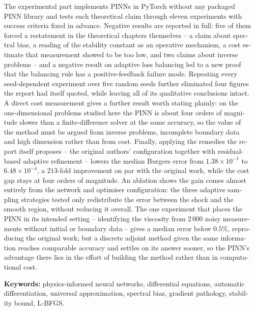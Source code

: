 \begin{english}
The experimental part implements PINNs in PyTorch without any packaged PINN
library and tests each theoretical claim through eleven experiments with success
criteria fixed in advance. Negative results are reported in full: five of them
forced a restatement in the theoretical chapters themselves -- a claim about
spectral bias, a reading of the stability constant as an operative mechanism,
a cost estimate that measurement showed to be too low, and two claims about
inverse problems -- and a negative
result on adaptive loss balancing led to a new proof that the balancing rule has
a positive-feedback failure mode. Repeating every seed-dependent experiment over
five random seeds further eliminated four figures the report had itself quoted,
while leaving all of its qualitative conclusions intact. A
direct cost measurement gives a further result worth stating plainly: on the
one-dimensional problems studied here the PINN is about four orders of magnitude
slower than a finite-difference solver at the same accuracy, so the value of the
method must be argued from inverse problems, incomplete boundary data and high
dimension rather than from cost. Finally, applying the remedies the report itself proposes -- the
original authors' configuration together with residual-based adaptive
refinement -- lowers the median Burgers error from $1.38\times10^{-1}$ to
$6.48\times10^{-4}$, a $213$-fold improvement on par with the original work,
while the cost gap stays at four orders of magnitude. An ablation shows the gain
comes almost entirely from the network and optimiser configuration: the three
adaptive sampling strategies tested only redistribute the error between the
shock and the smooth region, without reducing it overall. The one experiment that
places the PINN in its intended setting -- identifying the viscosity from $2\,000$
noisy measurements without initial or boundary data -- gives a median error below
$0.5\%$, reproducing the original work; but a discrete adjoint method given the
same information reaches comparable accuracy and settles on its answer sooner, so
the PINN's advantage there lies in the effort of building the method rather than
in computational cost.

\bigskip
\noindent\textbf{Keywords:} physics-informed neural networks, differential
equations, automatic differentiation, universal approximation, spectral bias,
gradient pathology, stability bound, L-BFGS.
\end{english}
